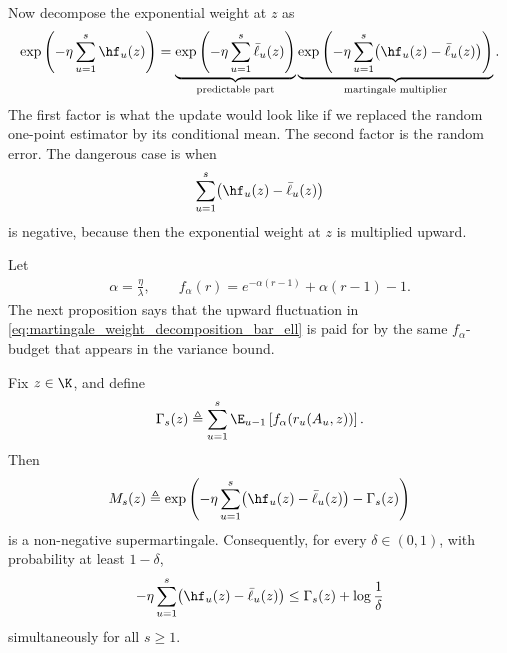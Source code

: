 Now decompose the exponential weight at \(z\) as
\begin{align}
    \exp\left(
    -\eta\sum_{u=1}^s \hf_u(z)
    \right)
    =
    \underbrace{
        \exp\left(
        -\eta\sum_{u=1}^s \bar{\ell}_u(z)
        \right)
    }_{\text{predictable part}}
    \underbrace{
        \exp\left(
        -\eta\sum_{u=1}^s
        \bigl(\hf_u(z)-\bar{\ell}_u(z)\bigr)
        \right)
    }_{\text{martingale multiplier}}.
    \label{eq:martingale_weight_decomposition_bar_ell}
\end{align}
The first factor is what the update would look like if we replaced the random one-point estimator by
its conditional mean. The second factor is the random error. The dangerous case is when
\[
    \sum_{u=1}^s
    \bigl(\hf_u(z)-\bar{\ell}_u(z)\bigr)
\]
is negative, because then the exponential weight at \(z\) is multiplied upward.

Let
\begin{align}
    \alpha=\frac{\eta}{\lambda},
    \qquad
    f_\alpha(r)=e^{-\alpha(r-1)}+\alpha(r-1)-1.
\end{align}
The next proposition says that the upward fluctuation in
\eqref{eq:martingale_weight_decomposition_bar_ell} is paid for by the same \(f_\alpha\)-budget that
appears in the variance bound.

\begin{proposition}
    \label{prop:pointwise_martingale_compensator_bar_ell}
    Fix \(z\in\K\), and define
    \begin{align}
        \Gamma_s(z)
        \triangleq
        \sum_{u=1}^s
        \E_{u-1}\left[
            f_\alpha(r_u(A_u,z))
            \right].
        \label{eq:Gamma_pointwise_f_alpha_budget}
    \end{align}
    Then
    \begin{align}
        M_s(z)
        \triangleq
        \exp\left(
        -\eta\sum_{u=1}^s
        \bigl(\hf_u(z)-\bar{\ell}_u(z)\bigr)
        -
        \Gamma_s(z)
        \right)
        \label{eq:pointwise_f_alpha_supermartingale}
    \end{align}
    is a non-negative supermartingale. Consequently, for every \(\delta\in(0,1)\), with probability
    at least \(1-\delta\),
    \begin{align}
        -\eta\sum_{u=1}^s
        \bigl(\hf_u(z)-\bar{\ell}_u(z)\bigr)
        \le
        \Gamma_s(z)+\log\frac1\delta
        \label{eq:pointwise_exponent_bound_no_alpha_loss}
    \end{align}
    simultaneously for all \(s\ge1\).
\end{proposition}

